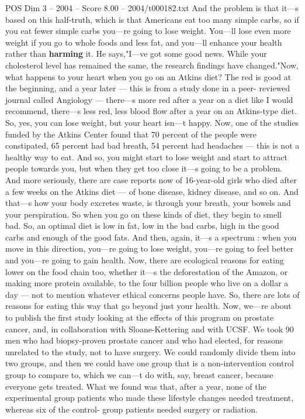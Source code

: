 \begin{textsample}{POS Dim 3 – 2004 – Score 8.00 – 2004/t000182.txt}
And the problem is that it—s based on this half-truth, which is that Americans eat too many simple carbs, so if you eat fewer simple carbs you—re going to lose weight.
You—ll lose even more weight if you go to whole foods and less fat, and you—ll enhance your health rather than \textbf{harming} it.
He says,"I—ve got some good news.
While your cholesterol level has remained the same, the research findings have changed."Now, what happens to your heart when you go on an Atkins diet?
The red is good at the beginning, and a year later — this is from a study done in a peer- reviewed journal called Angiology — there—s more red after a year on a diet like I would recommend, there—s less red, less blood flow after a year on an Atkins-type diet.
So, yes, you can lose weight, but your heart isn—t happy.
Now, one of the studies funded by the Atkins Center found that 70 percent of the people were constipated, 65 percent had bad breath, 54 percent had headaches — this is not a healthy way to eat.
And so, you might start to lose weight and start to attract people towards you, but when they get too close it—s going to be a problem.
And more seriously, there are case reports now of 16-year-old girls who died after a few weeks on the Atkins diet — of bone disease, kidney disease, and so on.
And that—s how your body excretes waste, is through your breath, your bowels and your perspiration.
So when you go on these kinds of diet, they begin to smell bad.
So, an optimal diet is low in fat, low in the bad carbs, high in the good carbs and enough of the good fats.
And then, again, it—s a spectrum : when you move in this direction, you—re going to lose weight, you—re going to feel better and you—re going to gain health.
Now, there are ecological reasons for eating lower on the food chain too, whether it—s the deforestation of the Amazon, or making more protein available, to the four billion people who live on a dollar a day — not to mention whatever ethical concerns people have.
So, there are lots of reasons for eating this way that go beyond just your health.
Now, we—re about to publish the first study looking at the effects of this program on prostate cancer, and, in collaboration with Sloane-Kettering and with UCSF.
We took 90 men who had biopsy-proven prostate cancer and who had elected, for reasons unrelated to the study, not to have surgery.
We could randomly divide them into two groups, and then we could have one group that is a non-intervention control group to compare to, which we can—t do with, say, breast cancer, because everyone gets treated.
What we found was that, after a year, none of the experimental group patients who made these lifestyle changes needed treatment, whereas six of the control- group patients needed surgery or radiation.

\end{textsample}
